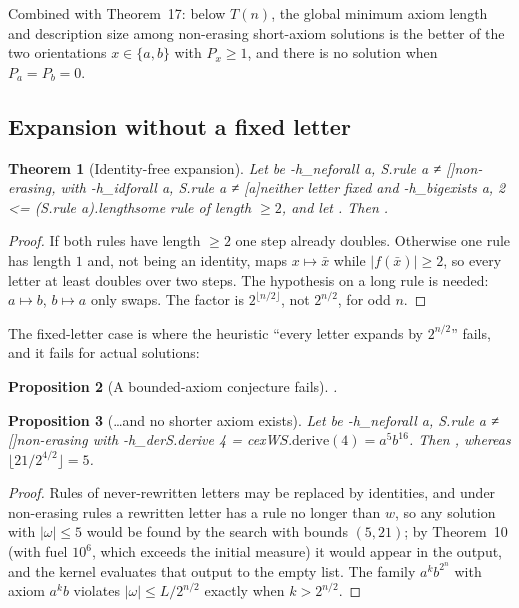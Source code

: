 \documentclass[11pt]{article}
\newtheorem{theorem}{Theorem}
\newtheorem{proposition}[theorem]{Proposition}
\theoremstyle{definition}
\theoremstyle{remark}
\begin{document}
Combined with Theorem~17: below $T(n)$, the global minimum axiom length and description size
among non-erasing short-axiom solutions is the better of the two orientations $x\in\{a,b\}$
with $P_x\ge1$, and there is no solution when $P_a=P_b=0$.

\subsection{Expansion without a fixed letter}

\begin{theorem}[Identity-free expansion]
Let  be \hyp{h_ne}{forall a, S.rule a ≠ []}{non-erasing}, with
\hyp{h_id}{forall a, S.rule a ≠ [a]}{neither letter fixed} and
\hyp{h_big}{exists a, 2 <= (S.rule a).length}{some rule of length $\ge2$}, and let .
Then .
\end{theorem}
\begin{proof}
If both rules have length $\ge2$ one step already doubles. Otherwise one rule has length $1$
and, not being an identity, maps $x\mapsto\bar x$ while $|f(\bar x)|\ge2$, so every letter at
least doubles over two steps. The hypothesis on a long rule is needed: $a\mapsto b$, $b\mapsto a$
only swaps. The factor is $2^{\lfloor n/2\rfloor}$, not $2^{n/2}$, for odd $n$.
\end{proof}

The fixed-letter case is where the heuristic ``every letter expands by $2^{n/2}$'' fails,
and it fails for actual solutions:

\begin{proposition}[A bounded-axiom conjecture fails]
.
\end{proposition}

\begin{proposition}[\ldots and no shorter axiom exists]
Let  be \hyp{h_ne}{forall a, S.rule a ≠ []}{non-erasing} with
\hyp{h_der}{S.derive 4 = cexW}{$S.\mathrm{derive}(4)=a^5b^{16}$}. Then
, whereas $\lfloor21/2^{4/2}\rfloor=5$.
\end{proposition}
\begin{proof}
Rules of never-rewritten letters may be replaced by identities, and under non-erasing rules a
rewritten letter has a rule no longer than $w$, so any solution with $|\omega|\le5$ would be
found by the search with bounds $(5,21)$; by Theorem~10 (with fuel $10^6$, which exceeds the
initial measure) it would appear in the output, and the kernel evaluates that output to the
empty list. The family $a^kb^{2^n}$ with axiom $a^kb$ violates $|\omega|\le L/2^{n/2}$ exactly
when $k>2^{n/2}$.
\end{proof}
\end{document}
